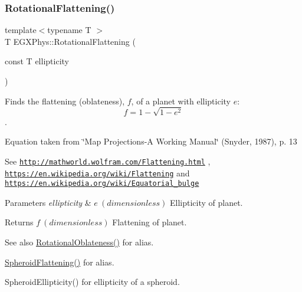 \subsubsection{\texorpdfstring{Rotational\+Flattening()}{RotationalFlattening()}\hspace{0.1cm}{\footnotesize\ttfamily [1/3]}}
{\footnotesize\ttfamily template$<$typename T $>$ \\
T E\+G\+X\+Phys\+::\+Rotational\+Flattening (\begin{DoxyParamCaption}\item[{const T}]{ellipticity }\end{DoxyParamCaption})}



Finds the flattening (oblateness), $f$, of a planet with ellipticity $e$\+: \[ f = 1 - \sqrt{1-e^2} \]. 

Equation taken from \char`\"{}\+Map Projections-\/\+A Working Manual\char`\"{} (Snyder, 1987), p. 13

See \href{http://mathworld.wolfram.com/Flattening.html}{\tt http\+://mathworld.\+wolfram.\+com/\+Flattening.\+html} , \href{https://en.wikipedia.org/wiki/Flattening}{\tt https\+://en.\+wikipedia.\+org/wiki/\+Flattening} and \href{https://en.wikipedia.org/wiki/Equatorial_bulge}{\tt https\+://en.\+wikipedia.\+org/wiki/\+Equatorial\+\_\+bulge} 
\begin{DoxyParams}{Parameters}
{\em ellipticity} & $ e\ (dimensionless)$ Ellipticity of planet. \\
\hline
\end{DoxyParams}
\begin{DoxyReturn}{Returns}
$ f\ (dimensionless)$ Flattening of planet. 
\end{DoxyReturn}
\begin{DoxySeeAlso}{See also}
\mbox{\hyperlink{group___e_g_x_phys-_astrophysics-_rotational_flattening_ga7d78d01c8b3e1a9b2e4f17cb67969a88}{Rotational\+Oblateness()}} for alias. 

\mbox{\hyperlink{group___e_g_x_math-_geometry-3_d-_spheroid-_flattening_ga640f4bcd86aa4c378819bffda31c0852}{Spheroid\+Flattening()}} for alias. 

Spheroid\+Ellipticity() for ellipticity of a spheroid. 
\end{DoxySeeAlso}
\mbox{\label{group___e_g_x_phys-_astrophysics-_rotational_flattening_ga1840fed2081c35f68c4b8bfa75248977}} 
